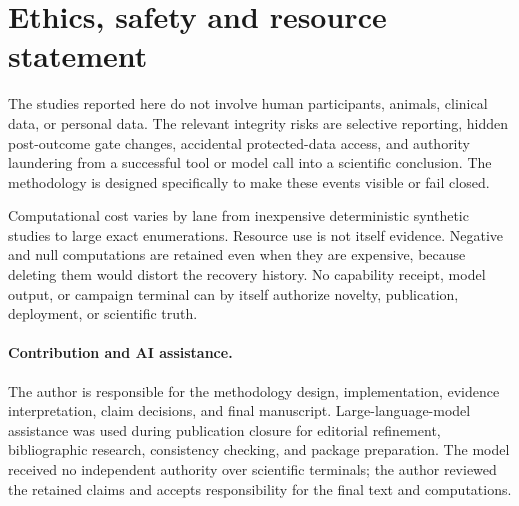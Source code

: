 \section{Ethics, safety and resource statement}

The studies reported here do not involve human participants, animals, clinical data, or personal data. The relevant integrity risks are selective reporting, hidden post-outcome gate changes, accidental protected-data access, and authority laundering from a successful tool or model call into a scientific conclusion. The methodology is designed specifically to make these events visible or fail closed.

Computational cost varies by lane from inexpensive deterministic synthetic studies to large exact enumerations. Resource use is not itself evidence. Negative and null computations are retained even when they are expensive, because deleting them would distort the recovery history. No capability receipt, model output, or campaign terminal can by itself authorize novelty, publication, deployment, or scientific truth.

\paragraph{Contribution and AI assistance.}
The author is responsible for the methodology design, implementation, evidence interpretation, claim decisions, and final manuscript. Large-language-model assistance was used during publication closure for editorial refinement, bibliographic research, consistency checking, and package preparation. The model received no independent authority over scientific terminals; the author reviewed the retained claims and accepts responsibility for the final text and computations.